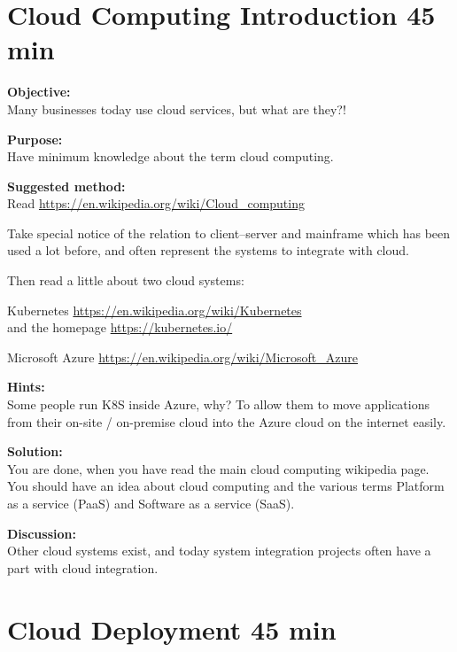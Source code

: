 \documentclass[a4paper,11pt,notitlepage]{report}
\begin{document}
\chapter{Cloud Computing Introduction 45 min}
\label{ex:cloud-intro}


{\bf Objective:}\\
Many businesses today use cloud services, but what are they?!

{\bf Purpose:}\\
Have minimum knowledge about the term cloud computing.

{\bf Suggested method:}\\
Read \url{https://en.wikipedia.org/wiki/Cloud_computing}

Take special notice of the relation to client--server and mainframe which has been used a lot before, and often represent the systems to integrate with cloud.

Then read a little about two cloud systems:
\begin{list2}
\item Kubernetes \url{https://en.wikipedia.org/wiki/Kubernetes}\\
 and the homepage \url{https://kubernetes.io/}
\item Microsoft Azure \url{https://en.wikipedia.org/wiki/Microsoft_Azure}
\end{list2}

{\bf Hints:}\\
Some people run K8S inside Azure, why? To allow them to move applications from their on-site / on-premise cloud into the Azure cloud on the internet easily.

{\bf Solution:}\\
You are done, when you have read the main cloud computing wikipedia page. You should have an idea about cloud computing and the various terms Platform as a service (PaaS) and Software as a service (SaaS).

{\bf Discussion:}\\
Other cloud systems exist, and today system integration projects often have a part with cloud integration.

\chapter{Cloud Deployment 45 min}
\label{ex:azure-secure-app}

\end{document}
